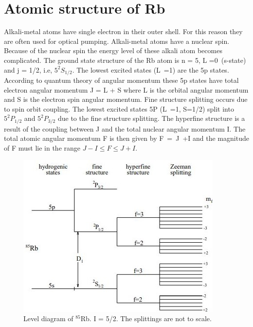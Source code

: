 \section{Atomic structure of Rb }
\label{sec:Rb structure} 
Alkali-metal atoms have single electron in their outer shell. For this reason they are often used for optical pumping. Alkali-metal atoms have a nuclear spin.
 Because of the nuclear spin the energy level of these alkali atom becomes complicated. The ground state structure of the Rb atom is n = 5, L =0~(s-state) and j = 1/2, i.e, $5^2S_{1/2}$. The lowest excited states (L~=1) are the 5p states. According to quantum theory of angular momentum these 5p states have total electron angular momentum J = L + S where L is the orbital angular momentum and S is the electron spin angular momentum. Fine structure splitting occurs due to spin orbit coupling.  The lowest excited states 5P (L~=1, S=1/2) split into  $5^2P_{1/2}$ and $5^2P_{3/2}$  due to the fine structure splitting. The hyperfine structure is a result of the coupling between J and the total nuclear angular momentum I. The total atomic angular momentum F is then given by F~=~J~+I  and the magnitude of F must lie in the range
$J - I \leq F \leq J + I$.
\begin{figure}[h]
\centering
\includegraphics[width=0.7\linewidth]{figures/Rb_structure.JPG}
\caption{Level diagram of $^{85}$Rb. I = 5/2. The splittings are not to scale. \label{fig:Rb_structure}}
\end{figure}


